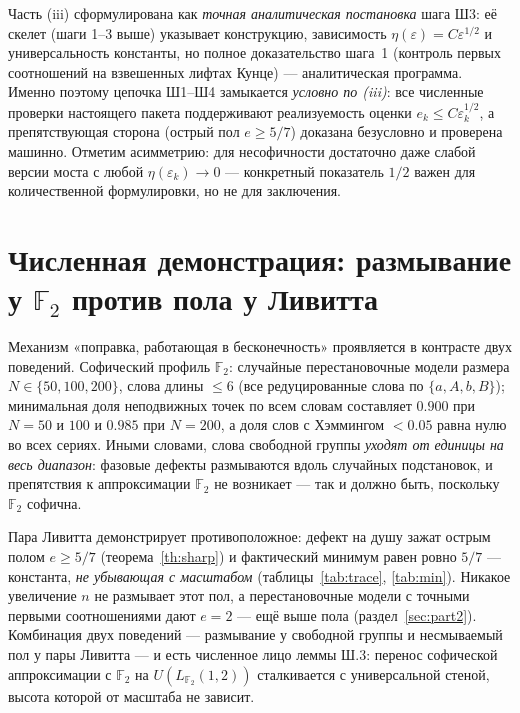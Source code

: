 \documentclass[11pt,a4paper]{article}
\theoremstyle{plain}
\theoremstyle{definition}
\theoremstyle{remark}
\begin{document}
\begin{honestybox}
Часть (iii) сформулирована как \emph{точная аналитическая постановка}
шага Ш3: её скелет (шаги 1--3 выше) указывает конструкцию, зависимость
$\eta(\varepsilon)=C\varepsilon^{1/2}$ и универсальность константы, но
полное доказательство шага~1 (контроль первых соотношений на
взвешенных лифтах Кунце) — аналитическая программа. Именно поэтому
цепочка Ш1--Ш4 замыкается \emph{условно по (iii)}: все численные
проверки настоящего пакета поддерживают реализуемость оценки
$e_k\le C\varepsilon_k^{1/2}$, а препятствующая сторона (острый пол
$e\ge 5/7$) доказана безусловно и проверена машинно. Отметим
асимметрию: для несофичности достаточно даже слабой версии моста с
любой $\eta(\varepsilon_k)\to 0$ — конкретный показатель $1/2$ важен
для количественной формулировки, но не для заключения.
\end{honestybox}

\section{Численная демонстрация: размывание у $\mathbb{F}_2$ против пола у Ливитта}
\label{sec:numeric}

Механизм «поправка, работающая в бесконечность» проявляется в контрасте
двух поведений. Софический профиль $\mathbb{F}_2$: случайные
перестановочные модели размера $N\in\{50,100,200\}$, слова длины
$\le 6$ (все редуцированные слова по $\{a,A,b,B\}$); минимальная
доля неподвижных точек по всем словам составляет $0.900$ при
$N=50$ и $100$ и $0.985$ при $N=200$, а доля слов с Хэммингом
$<0.05$ равна нулю во всех сериях. Иными словами, слова свободной
группы \emph{уходят от единицы на весь диапазон}: фазовые дефекты
размываются вдоль случайных подстановок, и препятствия к аппроксимации
$\mathbb{F}_2$ не возникает — так и должно быть, поскольку
$\mathbb{F}_2$ софична.

Пара Ливитта демонстрирует противоположное: дефект на душу зажат острым
полом $e\ge 5/7$ (теорема~\ref{th:sharp}) и фактический минимум равен
ровно $5/7$ — константа, \emph{не убывающая с масштабом}
(таблицы~\ref{tab:trace}, \ref{tab:min}). Никакое увеличение $n$ не
размывает этот пол, а перестановочные модели с точными первыми
соотношениями дают $e=2$ — ещё выше пола
(раздел~\ref{sec:part2}). Комбинация двух поведений — размывание у
свободной группы и несмываемый пол у пары Ливитта — и есть численное
лицо леммы Ш.3: перенос софической аппроксимации с $\mathbb{F}_2$ на
$U(L_{\mathbb{F}_2}(1,2))$ сталкивается с универсальной стеной, высота
которой от масштаба не зависит.
\end{document}
